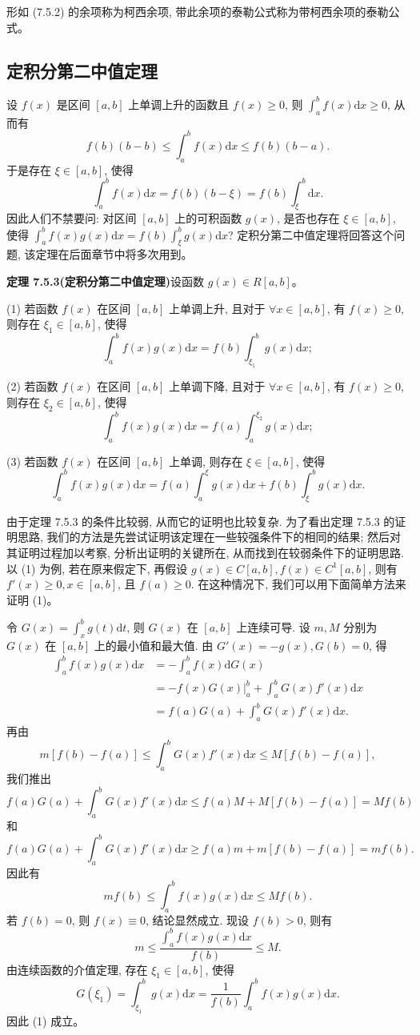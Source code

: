 \documentclass[UTF8,12pt,a4paper,fontset=fandol]{ctexart}
\begin{document}
形如 (7.5.2) 的余项称为柯西余项, 带此余项的泰勒公式称为带柯西余项的泰勒公式。

\subsection{定积分第二中值定理}

设 $f(x)$ 是区间 $[a,b]$ 上单调上升的函数且 $f(x)\geq0$, 则 $\int_a^b f(x)\mathrm dx\geq0$, 从而有
\[
  f(b)(b-b)\leq\int_a^b f(x)\mathrm dx\leq f(b)(b-a).
\]
于是存在 $\xi\in[a,b]$, 使得
\[
  \int_a^b f(x)\mathrm dx=f(b)(b-\xi)=f(b)\int_\xi^b\mathrm dx.
\]
因此人们不禁要问: 对区间 $[a,b]$ 上的可积函数 $g(x)$, 是否也存在 $\xi\in[a,b]$, 使得 $\int_a^b f(x)g(x)\mathrm dx=f(b)\int_\xi^b g(x)\mathrm dx$? 定积分第二中值定理将回答这个问题, 该定理在后面章节中将多次用到。

\noindent\textbf{定理 7.5.3(定积分第二中值定理)}\quad 设函数 $g(x)\in R[a,b]$。

(1) 若函数 $f(x)$ 在区间 $[a,b]$ 上单调上升, 且对于 $\forall x\in[a,b]$, 有 $f(x)\geq0$, 则存在 $\xi_1\in[a,b]$, 使得
\[
  \int_a^b f(x)g(x)\mathrm dx=f(b)\int_{\xi_1}^b g(x)\mathrm dx;
\]

(2) 若函数 $f(x)$ 在区间 $[a,b]$ 上单调下降, 且对于 $\forall x\in[a,b]$, 有 $f(x)\geq0$, 则存在 $\xi_2\in[a,b]$, 使得
\[
  \int_a^b f(x)g(x)\mathrm dx=f(a)\int_a^{\xi_2} g(x)\mathrm dx;
\]

(3) 若函数 $f(x)$ 在区间 $[a,b]$ 上单调, 则存在 $\xi\in[a,b]$, 使得
\[
  \int_a^b f(x)g(x)\mathrm dx
  =f(a)\int_a^\xi g(x)\mathrm dx+f(b)\int_\xi^b g(x)\mathrm dx.
\]

由于定理 7.5.3 的条件比较弱, 从而它的证明也比较复杂. 为了看出定理 7.5.3 的证明思路, 我们的方法是先尝试证明该定理在一些较强条件下的相同的结果; 然后对其证明过程加以考察, 分析出证明的关键所在, 从而找到在较弱条件下的证明思路. 以 (1) 为例, 若在原来假定下, 再假设 $g(x)\in C[a,b],f(x)\in C^1[a,b]$, 则有 $f'(x)\geq0,x\in[a,b]$, 且 $f(a)\geq0$. 在这种情况下, 我们可以用下面简单方法来证明 (1)。

令 $G(x)=\int_x^b g(t)\mathrm dt$, 则 $G(x)$ 在 $[a,b]$ 上连续可导. 设 $m,M$ 分别为 $G(x)$ 在 $[a,b]$ 上的最小值和最大值. 由 $G'(x)=-g(x),G(b)=0$, 得
\[
\begin{aligned}
  \int_a^b f(x)g(x)\mathrm dx
  &=-\int_a^b f(x)\mathrm dG(x)\\
  &=-\left.f(x)G(x)\right|_a^b+\int_a^b G(x)f'(x)\mathrm dx\\
  &=f(a)G(a)+\int_a^b G(x)f'(x)\mathrm dx.
\end{aligned}
\]
再由
\[
  m[f(b)-f(a)]\leq\int_a^b G(x)f'(x)\mathrm dx\leq M[f(b)-f(a)],
\]
我们推出
\[
  f(a)G(a)+\int_a^b G(x)f'(x)\mathrm dx
  \leq f(a)M+M[f(b)-f(a)]=Mf(b)
\]
和
\[
  f(a)G(a)+\int_a^b G(x)f'(x)\mathrm dx
  \geq f(a)m+m[f(b)-f(a)]=mf(b).
\]
因此有
\[
  mf(b)\leq\int_a^b f(x)g(x)\mathrm dx\leq Mf(b).
\]
若 $f(b)=0$, 则 $f(x)\equiv0$, 结论显然成立. 现设 $f(b)>0$, 则有
\[
  m\leq\frac{\int_a^b f(x)g(x)\mathrm dx}{f(b)}\leq M.
\]
由连续函数的介值定理, 存在 $\xi_1\in[a,b]$, 使得
\[
  G(\xi_1)=\int_{\xi_1}^b g(x)\mathrm dx
  =\frac{1}{f(b)}\int_a^b f(x)g(x)\mathrm dx.
\]
因此 (1) 成立。
\end{document}
